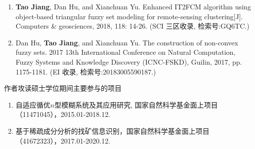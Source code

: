 \begin{paper}
\begin{enumerate}
  \item \textbf{Tao Jiang}, Dan Hu, and Xianchuan Yu.  Enhanced IT2FCM algorithm using object-based triangular fuzzy set modeling for remote-sensing clustering[J]. Computers \& geosciences, 2018, 118: 14-26. (SCI 三区收录, 检索号:GQ6TC.)
  \item Dan Hu, \textbf{Tao Jiang}, and Xianchuan Yu. The construction of non-convex fuzzy sets. 2017 13th International Conference on Natural Computation, Fuzzy Systems and Knowledge  Discovery (ICNC-FSKD), Guilin, 2017, pp. 1175-1181. (EI 收录, 检索号:20183005590187.)\\
  \end{enumerate}

\end{paper}





\begin{center}
  \Large 作者攻读硕士学位期间主要参与的项目
\end{center}

\begin{enumerate}[(1)]
\item 自适应循优$n$型模糊系统及其应用研究, 国家自然科学基金面上项目（11471045），2015.01-2018.12.

\item 基于稀疏成分分析的找矿信息识别，国家自然科学基金面上项目（41672323），2017.01-2020.12.

\end{enumerate}

